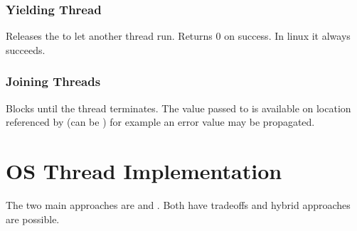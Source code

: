 \documentclass{report}
\begin{document}
\subsubsection*{Yielding Thread}

Releases the  to let another thread run. Returns $0$ on success. In linux it always succeeds.

\subsubsection*{Joining Threads}

Blocks until the thread terminates. The value passed to  is available on location referenced by  (can be ) for example an error value may be propagated.


\section*{OS Thread Implementation}
The two main  approaches are  and . Both have tradeoffs and hybrid approaches are possible.
\end{document}
